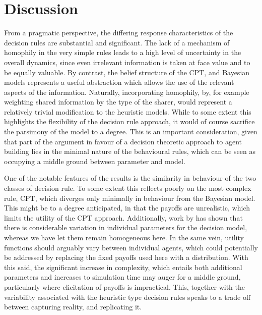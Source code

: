 \section{Discussion}
\label{sec:discussion}
%

From a pragmatic perspective, the differing response characteristics of the decision rules are substantial and significant. The lack of a mechanism of homophily in the very simple rules leads to a high level of uncertainty in the overall dynamics, since even irrelevant information is taken at face value and to be equally valuable. By contrast, the belief structure of the \ac{CPT}, and Bayesian models represents a useful abstraction which allows the use of the relevant aspects of the information.  Naturally, incorporating homophily, by, for example weighting shared information by the type of the sharer, would represent a relatively trivial modification to the heuristic models. While to some extent this highlights the flexibility of the decision rule approach, it would of course sacrifice the parsimony of the model to a degree. This is an important consideration, given that part of the argument in favour of a decision theoretic approach to agent building lies in the minimal nature of the behavioural rules, which can be seen as occupying a middle ground between parameter and model.

One of the notable features of the results is the similarity in behaviour of the two classes of decision rule. To some extent this reflects poorly on the most complex rule, \ac{CPT}, which diverges only minimally in behaviour from the Bayesian model. This might be to a degree anticipated, in that the payoffs are unrealistic, which limits the utility of the \ac{CPT} approach.  Additionally, work by \citet{Glockner2012} has shown that there is considerable variation in individual parameters for the decision model, whereas we have let them remain homogeneous here. In the same vein, utility functions should arguably vary between individual agents, which could potentially be addressed by replacing the fixed payoffs used here with a distribution.  With this said, the significant increase in complexity, which entails both additional parameters and increases to simulation time may auger for a middle ground, particularly where elicitation of payoffs is impractical.  This, together with the variability associated with the heuristic type decision rules speaks to a trade off between capturing reality, and replicating it.

